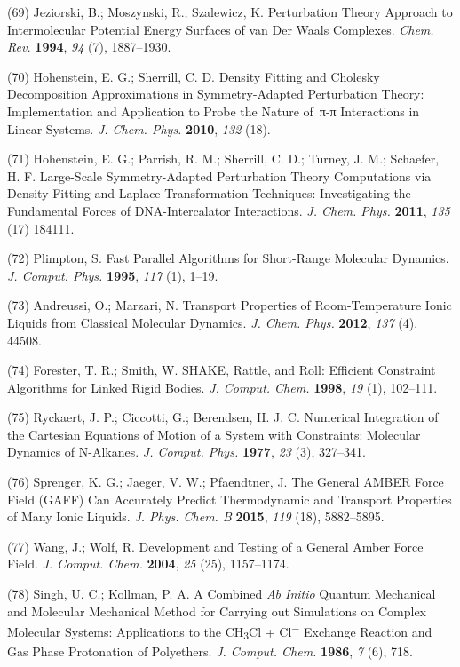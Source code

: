 \documentclass[]{article}
\begin{document}
(69) Jeziorski, B.; Moszynski, R.; Szalewicz, K. Perturbation Theory
Approach to Intermolecular Potential Energy Surfaces of van Der Waals
Complexes. \emph{Chem. Rev.} \textbf{1994}, \emph{94} (7), 1887--1930.

(70) Hohenstein, E. G.; Sherrill, C. D. Density Fitting and Cholesky
Decomposition Approximations in Symmetry-Adapted Perturbation Theory:
Implementation and Application to Probe the Nature of\, π-π Interactions
in Linear Systems. \emph{J. Chem. Phys.} \textbf{2010}, \emph{132} (18).

(71) Hohenstein, E. G.; Parrish, R. M.; Sherrill, C. D.; Turney, J. M.;
Schaefer, H. F. Large-Scale Symmetry-Adapted Perturbation Theory
Computations via Density Fitting and Laplace Transformation Techniques:
Investigating the Fundamental Forces of DNA-Intercalator Interactions.
\emph{J. Chem. Phys.} \textbf{2011}, \emph{135} (17) 184111.

(72) Plimpton, S. Fast Parallel Algorithms for Short-Range Molecular
Dynamics. \emph{J. Comput. Phys.} \textbf{1995}, \emph{117} (1), 1--19.

(73) Andreussi, O.; Marzari, N. Transport Properties of Room-Temperature
Ionic Liquids from Classical Molecular Dynamics. \emph{J. Chem. Phys.}
\textbf{2012}, \emph{137} (4), 44508.

(74) Forester, T. R.; Smith, W. SHAKE, Rattle, and Roll: Efficient
Constraint Algorithms for Linked Rigid Bodies. \emph{J. Comput. Chem.}
\textbf{1998}, \emph{19} (1), 102--111.

(75) Ryckaert, J. P.; Ciccotti, G.; Berendsen, H. J. C. Numerical
Integration of the Cartesian Equations of Motion of a System with
Constraints: Molecular Dynamics of N-Alkanes. \emph{J. Comput. Phys.}
\textbf{1977}, \emph{23} (3), 327--341.

(76) Sprenger, K. G.; Jaeger, V. W.; Pfaendtner, J. The General AMBER
Force Field (GAFF) Can Accurately Predict Thermodynamic and Transport
Properties of Many Ionic Liquids. \emph{J. Phys. Chem. B} \textbf{2015},
\emph{119} (18), 5882--5895.

(77) Wang, J.; Wolf, R. Development and Testing of a General Amber Force
Field. \emph{J. Comput. Chem.} \textbf{2004}, \emph{25} (25),
1157--1174.

(78) Singh, U. C.; Kollman, P. A. A Combined \emph{Ab Initio} Quantum
Mechanical and Molecular Mechanical Method for Carrying out Simulations
on Complex Molecular Systems: Applications to the CH\textsubscript{3}Cl
+ Cl\textsuperscript{−} Exchange Reaction and Gas Phase Protonation of
Polyethers. \emph{J. Comput. Chem.} \textbf{1986}, \emph{7} (6), 718.
\end{document}
